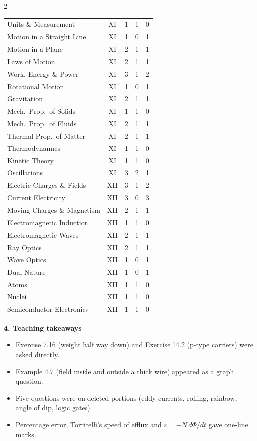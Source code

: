 \begin{multicols}{2}
{\begin{tabular}{@{}p{4.7cm}c@{\,}r@{\,}r@{\,}r@{}}
Units \& Measurement & XI & 1 & 1 & 0\\
Motion in a Straight Line & XI & 1 & 0 & 1\\
Motion in a Plane & XI & 2 & 1 & 1\\
Laws of Motion & XI & 2 & 1 & 1\\
Work, Energy \& Power & XI & 3 & 1 & 2\\
Rotational Motion & XI & 1 & 0 & 1\\
Gravitation & XI & 2 & 1 & 1\\
Mech.\ Prop.\ of Solids & XI & 1 & 1 & 0\\
Mech.\ Prop.\ of Fluids & XI & 2 & 1 & 1\\
Thermal Prop.\ of Matter & XI & 2 & 1 & 1\\
Thermodynamics & XI & 1 & 1 & 0\\
Kinetic Theory & XI & 1 & 1 & 0\\
Oscillations & XI & 3 & 2 & 1\\
Electric Charges \& Fields & XII & 3 & 1 & 2\\
Current Electricity & XII & 3 & 0 & 3\\
Moving Charges \& Magnetism & XII & 2 & 1 & 1\\
Electromagnetic Induction & XII & 1 & 1 & 0\\
Electromagnetic Waves & XII & 2 & 1 & 1\\
Ray Optics & XII & 2 & 1 & 1\\
Wave Optics & XII & 1 & 0 & 1\\
Dual Nature & XII & 1 & 0 & 1\\
Atoms & XII & 1 & 1 & 0\\
Nuclei & XII & 1 & 1 & 0\\
Semiconductor Electronics & XII & 1 & 1 & 0\\
\bottomrule\end{tabular}}\par\medskip
\textbf{\color{crimson}4. Teaching takeaways}\par\smallskip
{\footnotesize\begin{itemize}[leftmargin=1em,nosep]
\item Exercise 7.16 (weight half way down) and Exercise 14.2 (p-type carriers) were asked directly.
\item Example 4.7 (field inside and outside a thick wire) appeared as a graph question.
\item Five questions were on deleted portions (eddy currents, rolling, rainbow, angle of dip, logic gates).
\item Percentage error, Torricelli's speed of efflux and $\varepsilon=-N\,d\Phi/dt$ gave one-line marks.

\end{itemize}}
\end{multicols}
